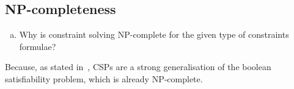 \subsection{NP-completeness}

\begin{enumerate}[(c)]
\item Why is constraint solving NP-complete for the given type of constraints formulae?
\end{enumerate}

Because, as stated in~\cite{MF19}, CSPs are a strong generalisation of the boolean satisfiability problem, which is already NP-complete.
